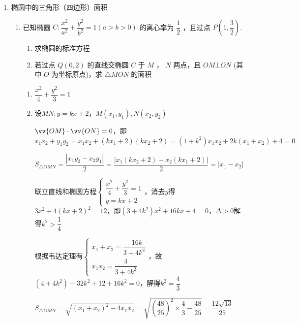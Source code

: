 \begin{enumerate}
    \item 椭圆中的三角形（四边形）面积
    \begin{enumerate}
        \item 已知椭圆 $C : \dfrac{{x}^{2}}{{a}^{2}} + \dfrac{{y}^{2}}{{b}^{2}} = 1\left( {a > b > 0}\right)$ 的离心率为 $\dfrac{1}{2}$ ，且过点 $P\left( {1,\dfrac{3}{2}}\right)$.
        \begin{enumerate}
            \item 求椭圆的标准方程
            \item 若过点 $Q\left( {0,2}\right)$ 的直线交椭圆 $C$ 于 $M$ ， $N$ 两点，且 ${OM}\bot {ON}$ (其中 $O$ 为坐标原点)，求 $\bigtriangleup  {MON}$ 的面积
        \end{enumerate}
        \begin{jieda}
            \begin{enumerate}
                \item $\dfrac{x^2}{4}+\dfrac{y^2}{3} = 1$
                \item 设$MN: y = kx+2$，$M(x_1, y_1), N(x_2, y_2)$
                
                $\vv{OM} \cdot \vv{ON} = 0$，即$x_1x_2+y_1y_2 = x_1x_2+(kx_1+2)(kx_2+2) = (1+k^2)x_1x_2+2k(x_1+x_2)+4 = 0$


                $S_{\triangle OMN} = \dfrac{|x_1y_2-x_2y_1|}{2} = \dfrac{|x_1(kx_2+2)-x_2(kx_1+2)|}{2} = |x_1-x_2|$

                联立直线和椭圆方程$\left\{\begin{array}{l}
                     \dfrac{{x}^{2}}{4} + \dfrac{{y}^{2}}{3} = 1  \\
                     y = kx+2
                \end{array}\right.$，消去$y$得$3x^2+4(kx+2)^2 = 12$，即$(3+4k^2)x^2+16kx + 4 = 0$，$\Delta > 0$解得$k^2 > \dfrac{1}{4}$
                
                根据韦达定理有$\left\{\begin{array}{l}
                    x_1+x_2 = \dfrac{-16k}{3+4k^2} \\
                    x_1x_2 = \dfrac{4}{3+4k^2}
                \end{array} \right.$，故$(4+4k^2)-32k^2+12+16k^2 = 0$，解得$k^2 = \dfrac{4}{3}$

                $S_{\triangle OMN} = \sqrt{(x_1+x_2)^2-4x_1x_2} = \sqrt{\left(\dfrac{48}{25}\right)^2 \times \dfrac{4}{3} - \dfrac{48}{25}} = \dfrac{12\sqrt{13}}{25}$
            \end{enumerate}
        \end{jieda}



\end{enumerate}
\end{enumerate}
